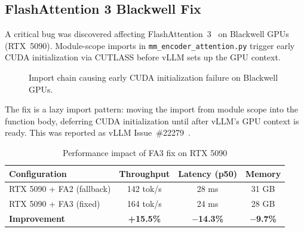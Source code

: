 \documentclass[11pt,letterpaper]{article}
\theoremstyle{definition}
\begin{document}
\subsection{FlashAttention 3 Blackwell Fix}
\label{sec:fa3-fix}

A critical bug was discovered affecting FlashAttention~3~\cite{shah2024flashattention3} on Blackwell GPUs (RTX~5090). Module-scope imports in \texttt{mm\_encoder\_attention.py} trigger early CUDA initialization via CUTLASS before vLLM sets up the GPU context.

\begin{figure}[htbp]
\centering
{}
\caption{Import chain causing early CUDA initialization failure on Blackwell GPUs.}
\label{fig:fa3-import-chain}
\end{figure}

The fix is a lazy import pattern: moving the import from module scope into the function body, deferring CUDA initialization until after vLLM's GPU context is ready. This was reported as vLLM Issue~\#22279~\cite{vllm-blackwell-issue}.

\begin{table}[htbp]
\centering
\caption{Performance impact of FA3 fix on RTX 5090}
\label{tab:fa3-performance}
\begin{tabular}{@{}lccc@{}}
\toprule
\textbf{Configuration} & \textbf{Throughput} & \textbf{Latency (p50)} & \textbf{Memory} \\
\midrule
RTX 5090 + FA2 (fallback) & 142 tok/s & 28 ms & 31 GB \\
RTX 5090 + FA3 (fixed) & 164 tok/s & 24 ms & 28 GB \\
\midrule
\textbf{Improvement} & \textbf{+15.5\%} & \textbf{$-$14.3\%} & \textbf{$-$9.7\%} \\
\bottomrule
\end{tabular}
\end{table}
\end{document}
